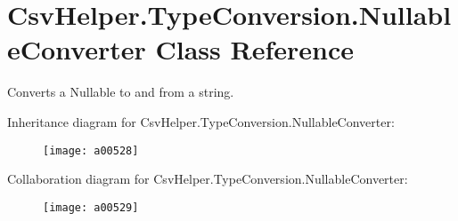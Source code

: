 \hypertarget{a00133}{\section{Csv\-Helper.\-Type\-Conversion.\-Nullable\-Converter Class Reference}
\label{a00133}
}


Converts a Nullable to and from a string.  




Inheritance diagram for Csv\-Helper.\-Type\-Conversion.\-Nullable\-Converter\-:
\nopagebreak
\begin{figure}[H]
\begin{center}
\leavevmode
\texttt{[image: a00528]}
\end{center}
\end{figure}


Collaboration diagram for Csv\-Helper.\-Type\-Conversion.\-Nullable\-Converter\-:
\nopagebreak
\begin{figure}[H]
\begin{center}
\leavevmode
\texttt{[image: a00529]}
\end{center}
\end{figure}
